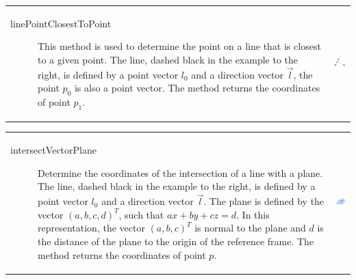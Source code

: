 \begin{tabular}{l l}
\begin{minipage}{0.7\textwidth}
\begin{description}
\item[linePointClosestToPoint] This method is used to determine the
  point on a line that is closest to a given point. The line, dashed
  black in the example to the right, is defined by a point vector
  $l_0$ and a direction vector $\vec{l}$, the point $p_0$ is also a
  point vector. The method returns the coordinates of point $p_1$.
\end{description}
\end{minipage}
&
\begin{minipage}{0.3\textwidth}
\includegraphics[width=2.5cm]{pointlcp.png}
\end{minipage}
\end{tabular}

\begin{tabular}{l l}
\begin{minipage}{0.7\textwidth}
\begin{description}
\item[intersectVectorPlane] Determine the coordinates of the
  intersection of a line with a plane. The line, dashed black in the
  example to the right, is defined by a point vector $l_0$ and a
  direction vector $\vec{l}$. The plane is defined by the vector $(a,
  b, c, d)^T$, such that $ax + by + cz = d$. In this representation,
  the vector $(a,b,c)^T$ is normal to the plane and $d$ is the
  distance of the plane to the origin of the reference frame. The
  method returns the coordinates of point $p$.
\end{description}
\end{minipage}
&
\begin{minipage}{0.3\textwidth}
\includegraphics[width=3cm]{intersectvectorplane.png}
\end{minipage}
\end{tabular}

